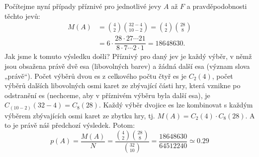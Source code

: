 \begin{mdframed}[style=mdexam]
\begin{example}
      Počítejme nyní případy příznivé pro jednotlivé jevy \(A\) až \(F\) a pravděpodobnosti těchto
      jevů:
      \begin{align*}
        M(A) &= \binom{4}{2}\binom{32 - 4}{10 - 2}
              = \binom{4}{2}\binom{28}{8}                                     \\
             &= 6\cdot\dfrac{28\cdot27\cdots21}{8\cdot7\cdots2\cdot1} = \num{18648630}.
      \end{align*}
      Jak jsme k tomuto výsledku došli? Příznivý pro daný jev je každý výběr, v němž jsou obsažena
      právě dvě esa (libovolných barev) a žádná další esa (význam slova „právě“). Počet výběrů dvou
      es z celkového počtu čtyř es je \(C_2(4)\), počet výběrů dalších libovolných osmi karet ze
      zbývající části hry, která vznikne po odstranění es (nechceme, aby v příznivém výběru byla
      další esa), je \(C_{(10-2)}(32 - 4) = C_8(28)\). Každý výběr dvojice es lze kombinovat s
      každým výběrem zbývajících osmi karet ze zbytku hry, tj. \(M(A) = C_2(4)\cdot C_8(28)\). A to
      je právě náš předchozí výsledek. Potom:
      \begin{equation*}
        p(A) = \dfrac{M(A)}{N} 
             = \dfrac{\binom{4}{2}\binom{28}{8}}{\binom{32}{10}}
             = \dfrac{\num{18648630}}{\num{64512240}} \simeq \num{0.29}
      \end{equation*}
      

\end{example}
\end{mdframed}
